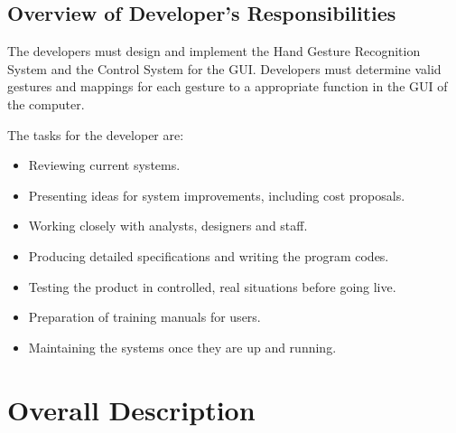\documentclass[11pt]{report}
\begin{document}
\subsection{Overview of Developer's Responsibilities}
The developers must design and implement the Hand Gesture Recognition System and the Control System for the GUI. Developers must determine valid gestures and mappings for each gesture to a appropriate function in the GUI of the computer. 

The tasks for the developer are:
\begin{itemize}
\item Reviewing current systems.
\item Presenting ideas for system improvements, including cost proposals.
\item Working closely with analysts, designers and staff.
\item Producing detailed specifications and writing the program codes.
\item Testing the product in controlled, real situations before going live.
\item Preparation of training manuals for users.
\item Maintaining the systems once they are up and running.
\end{itemize}

\newpage
\section{Overall Description}
\end{document}
